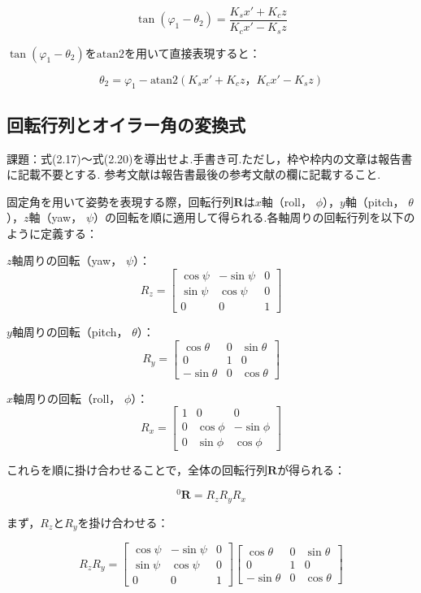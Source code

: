 \[
  \tan(\varphi_1 - \theta_2) = \frac{K_s x' + K_c z}{K_c x' - K_s z}
\]

$\tan(\varphi_1 - \theta_2)$を$\text{atan2}$を用いて直接表現すると：

\[
  \theta_2 = \varphi_1 - \text{atan2}\left( K_s x' + K_c z， K_c x' - K_s z \right) \tag{2.14}
\]

\subsection{回転行列とオイラー角の変換式}
課題：式(2.17)～式(2.20)を導出せよ.手書き可.ただし，枠や枠内の文章は報告書に記載不要とする.
参考文献は報告書最後の参考文献の欄に記載すること.

固定角を用いて姿勢を表現する際，回転行列$\mathbf{R}$は$x$軸（roll， $\phi$），$y$軸（pitch， $\theta$），$z$軸（yaw， $\psi$）の回転を順に適用して得られる.各軸周りの回転行列を以下のように定義する：

$z$軸周りの回転（yaw， $\psi$）：
\[
  R_z = \begin{bmatrix} 
    \cos \psi & -\sin \psi & 0  \\ 
    \sin \psi & \cos \psi  & 0  \\ 
    0         & 0          & 1 
  \end{bmatrix}
\]

$y$軸周りの回転（pitch， $\theta$）：
\[
  R_y = \begin{bmatrix} 
    \cos \theta  & 0 & \sin \theta  \\ 
    0            & 1 & 0            \\ 
    -\sin \theta & 0 & \cos \theta 
  \end{bmatrix}
\]

$x$軸周りの回転（roll， $\phi$）：
\[
  R_x = \begin{bmatrix} 
    1 & 0         & 0          \\ 
    0 & \cos \phi & -\sin \phi \\ 
    0 & \sin \phi & \cos \phi 
  \end{bmatrix}
\]

これらを順に掛け合わせることで，全体の回転行列$\mathbf{R}$が得られる：

\[
  ^0\mathbf{R} = R_z R_y R_x
\]

まず，$R_z$と$R_y$を掛け合わせる：

\[
  R_z R_y = \begin{bmatrix} 
    \cos \psi & -\sin \psi & 0  \\ 
    \sin \psi & \cos \psi  & 0  \\ 
    0         & 0          & 1 
  \end{bmatrix}
  \begin{bmatrix} 
    \cos \theta  & 0 & \sin \theta  \\ 
    0            & 1 & 0            \\ 
    -\sin \theta & 0 & \cos \theta 
  \end{bmatrix}
\]

